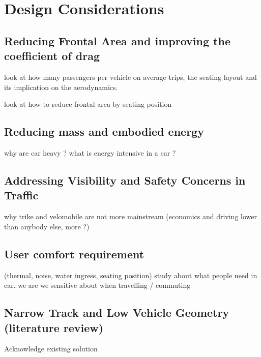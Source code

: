 \section{Design Considerations}

\subsection{Reducing Frontal Area and improving the coefficient of drag}
look at how many passengers per vehicle on average trips, the seating layout and its implication on the aerodynamics.

look at how to reduce frontal area by seating position

\subsection{Reducing mass and embodied energy}
why are car heavy ? what is energy intensive in a car ?

\subsection{Addressing Visibility and Safety Concerns in Traffic}

why trike and velomobile are not more mainstream (economics and  driving lower than anybody else, more ?)

\subsection{User comfort requirement}
(thermal, noise, water ingress, seating position)
study about what people need in car. we are we sensitive about when travelling / commuting

\subsection{Narrow Track and Low Vehicle Geometry (literature review)}
Acknowledge existing solution